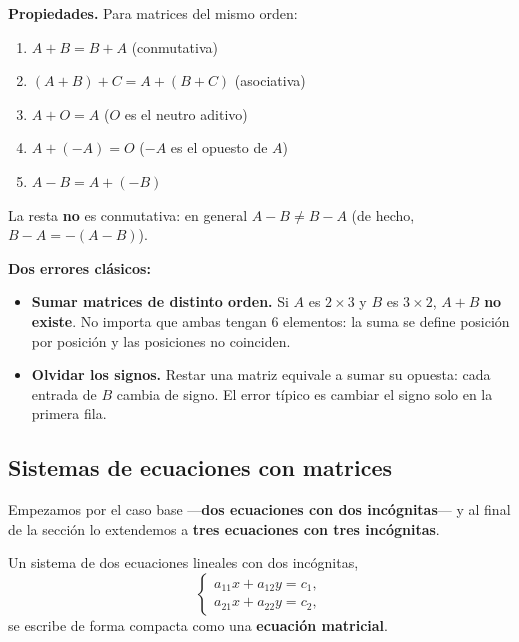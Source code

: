 \documentclass[12pt, letterpaper]{article}
\begin{document}
\begin{cuadroteoria}
  \small
  \textbf{Propiedades.} Para matrices del mismo orden:
  \begin{enumerate}[leftmargin=1.4em, nosep]
    \item $A+B=B+A$ \quad (conmutativa)
    \item $(A+B)+C=A+(B+C)$ \quad (asociativa)
    \item $A+O=A$ \quad ($O$ es el neutro aditivo)
    \item $A+(-A)=O$ \quad ($-A$ es el opuesto de $A$)
    \item $A-B=A+(-B)$
  \end{enumerate}
  La resta \textbf{no} es conmutativa: en general $A-B\neq B-A$ (de hecho,
  $B-A=-(A-B)$).
\end{cuadroteoria}

\begin{cuadroadvertencia}
  \small
  \textbf{Dos errores clásicos:}
  \begin{itemize}[leftmargin=1.2em, nosep]
    \item \textbf{Sumar matrices de distinto orden.} Si $A$ es $2\times3$ y
          $B$ es $3\times2$, $A+B$ \textbf{no existe}. No importa que ambas
          tengan $6$ elementos: la suma se define posición por posición y las
          posiciones no coinciden.
    \item \textbf{Olvidar los signos.} Restar una matriz equivale a sumar su
          opuesta: cada entrada de $B$ cambia de signo. El error típico es
          cambiar el signo solo en la primera fila.
  \end{itemize}
\end{cuadroadvertencia}

\subsection{Sistemas de ecuaciones con matrices}

Empezamos por el caso base ---\textbf{dos ecuaciones con dos incógnitas}--- y
al final de la sección lo extendemos a \textbf{tres ecuaciones con tres
incógnitas}.

Un sistema de dos ecuaciones lineales con dos incógnitas,
\[
  \begin{cases}
    a_{11}x+a_{12}y=c_1,\\
    a_{21}x+a_{22}y=c_2,
  \end{cases}
\]
se escribe de forma compacta como una \textbf{ecuación matricial}.
\end{document}
